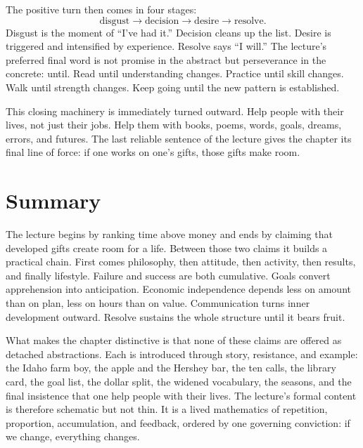 The positive turn then comes in four stages:
\begin{equation}
\text{disgust} \to \text{decision} \to \text{desire} \to \text{resolve}.
\end{equation}
Disgust is the moment of ``I've had it.'' Decision cleans up the list. Desire is triggered and intensified by experience. Resolve says ``I will.'' The lecture's preferred final word is not promise in the abstract but perseverance in the concrete: until. Read until understanding changes. Practice until skill changes. Walk until strength changes. Keep going until the new pattern is established.

This closing machinery is immediately turned outward. Help people with their lives, not just their jobs. Help them with books, poems, words, goals, dreams, errors, and futures. The last reliable sentence of the lecture gives the chapter its final line of force: if one works on one's gifts, those gifts make room.

\section{Summary}

The lecture begins by ranking time above money and ends by claiming that developed gifts create room for a life. Between those two claims it builds a practical chain. First comes philosophy, then attitude, then activity, then results, and finally lifestyle. Failure and success are both cumulative. Goals convert apprehension into anticipation. Economic independence depends less on amount than on plan, less on hours than on value. Communication turns inner development outward. Resolve sustains the whole structure until it bears fruit.

What makes the chapter distinctive is that none of these claims are offered as detached abstractions. Each is introduced through story, resistance, and example: the Idaho farm boy, the apple and the Hershey bar, the ten calls, the library card, the goal list, the dollar split, the widened vocabulary, the seasons, and the final insistence that one help people with their lives. The lecture's formal content is therefore schematic but not thin. It is a lived mathematics of repetition, proportion, accumulation, and feedback, ordered by one governing conviction: if we change, everything changes.